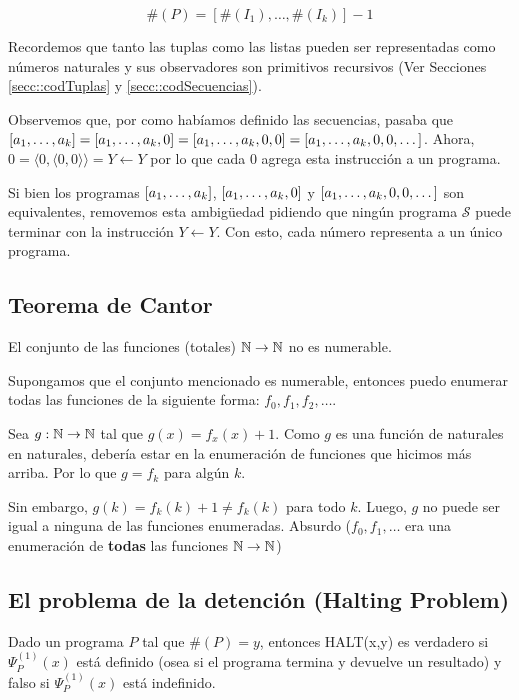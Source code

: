 $$\#(P) = [\#(I_1),\dots,\#(I_k)] - 1$$

Recordemos que tanto las tuplas como las listas pueden ser representadas como números naturales y sus observadores son primitivos recursivos (Ver Secciones \ref{secc::codTuplas} y \ref{secc::codSecuencias}).


Observemos que, por como habíamos definido las secuencias, pasaba que $[a_1,\dots, a_{k}] = [a_1,\dots, a_{k}, 0] = [a_1,\dots, a_{k},0,0] = [a_1,\dots, a_{k}, 0, 0,\dots]$. Ahora, $0 = \langle 0,\langle0,0 \rangle\rangle= Y \leftarrow Y$ por lo que cada $0$ agrega esta instrucción a un programa.

Si bien los programas $[a_1,\dots, a_{k}]$, $[a_1,\dots, a_{k}, 0]$ y $[a_1,\dots, a_{k}, 0, 0,\dots]$ son equivalentes, removemos esta ambigüedad pidiendo que ningún programa $\mathcal{S}$ puede terminar con la instrucción $Y\leftarrow Y$. Con esto, cada número representa a un único programa.

\subsection{Teorema de Cantor}
\begin{teorema}\label{teorema::cantor}
	El conjunto de las funciones (totales) $\mathbb{N}\to\mathbb{N}$ no es numerable.
\end{teorema}

\begin{demo}
	Supongamos que el conjunto mencionado es numerable, entonces puedo enumerar todas las funciones de la siguiente forma: $f_0, f_1,f_2,\dots$.
	
	Sea $g:\mathbb{N}\to\mathbb{N}$ tal que $g(x) = f_x(x) + 1$. Como $g$ es una función de naturales en naturales, debería estar en la enumeración de funciones que hicimos más arriba. Por lo que $g = f_k$ para algún $k$.
	
	Sin embargo, $g(k) = f_k(k) + 1 \neq f_k(k)$ para todo $k$. Luego, $g$ no puede 	ser igual a ninguna de las funciones enumeradas. Absurdo ($f_0,f_1,\dots$ era una enumeración de \textbf{todas} las funciones $\mathbb{N}\to\mathbb{N}$)
\end{demo}

\subsection{El problema de la detención (Halting Problem)}
Dado un programa $P$ tal que $\#(P) = y$, entonces HALT(x,y) es verdadero si $\Psi_P^{(1)}(x)$ está definido (osea si el programa termina y devuelve un resultado) y falso si $\Psi_P^{(1)}(x)$ está indefinido.

